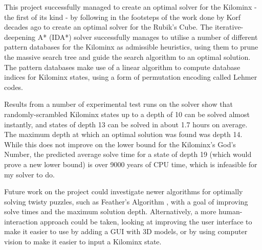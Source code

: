 This project successfully managed to create an optimal solver for the Kilominx - the first of its kind - by following in the footsteps of the work done by Korf decades ago to create an optimal solver for the Rubik's Cube. The iterative-deepening A* (IDA*) solver successfully manages to utilise a number of different pattern databases for the Kilominx as admissible heuristics, using them to prune the massive search tree and guide the search algorithm to an optimal solution. The pattern databases make use of a linear algorithm to compute database indices for Kilominx states, using a form of permutation encoding called Lehmer codes.

Results from a number of experimental test runs on the solver show that randomly-scrambled Kilominx states up to a depth of 10 can be solved almost instantly, and states of depth 13 can be solved in about 1.7 hours on average. The maximum depth at which an optimal solution was found was depth 14. While this does not improve on the lower bound for the Kilominx's God's Number, the predicted average solve time for a state of depth 19 (which would prove a new lower bound) is over 9000 years of CPU time, which is infeasible for my solver to do.

Future work on the project could investigate newer algorithms for optimally solving twisty puzzles, such as Feather's Algorithm \cite{feather}, with a goal of improving solve times and the maximum solution depth. Alternatively, a more human-interaction approach could be taken, looking at improving the user interface to make it easier to use by adding a GUI with 3D models, or by using computer vision to make it easier to input a Kilominx state.